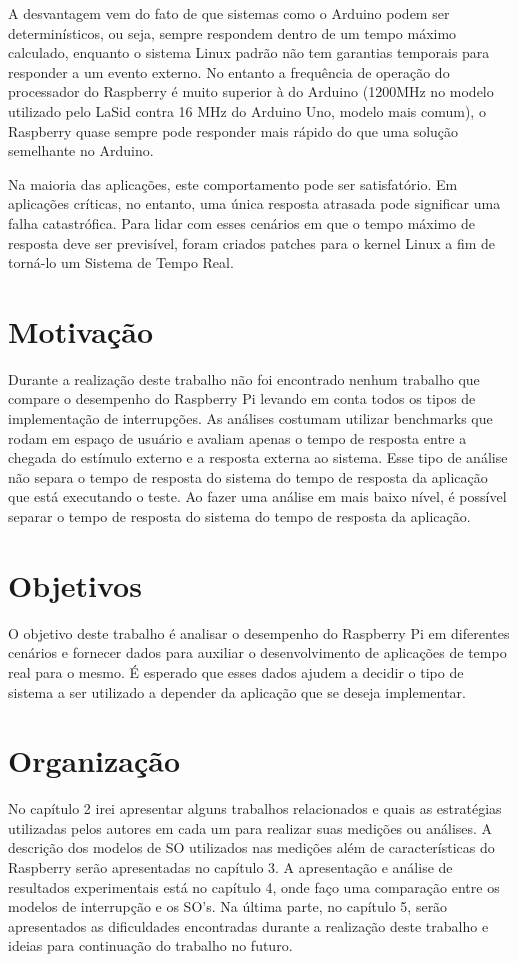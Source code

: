 A desvantagem vem do fato de que sistemas como o Arduino podem ser determinísticos, ou seja, sempre respondem dentro de um tempo máximo calculado, enquanto o sistema Linux padrão não tem garantias temporais para responder a um evento externo. No entanto a frequência de operação do processador do Raspberry é muito superior à do Arduino (1200MHz no modelo utilizado pelo LaSid contra 16 MHz do Arduino Uno, modelo mais comum), o Raspberry quase sempre pode responder mais rápido do que uma solução semelhante no Arduino.

Na maioria das aplicações, este comportamento pode ser satisfatório. Em aplicações críticas, no entanto, uma única resposta atrasada pode significar uma falha catastrófica. Para lidar com esses cenários em que o tempo máximo de resposta deve ser previsível, foram criados patches para o kernel Linux a fim de torná-lo um Sistema de Tempo Real. 

\section{Motivação}

Durante a realização deste trabalho não foi encontrado nenhum trabalho que compare o desempenho do Raspberry Pi levando em conta todos os tipos de implementação de interrupções. As análises costumam utilizar benchmarks que rodam em espaço de usuário e avaliam apenas o tempo de resposta entre a chegada do estímulo externo e a resposta externa ao sistema. Esse tipo de análise não separa o tempo de resposta do sistema do tempo de resposta da aplicação que está executando o teste. Ao fazer uma análise em mais baixo nível, é possível separar o tempo de resposta do sistema do tempo de resposta da aplicação.

\section{Objetivos}

O objetivo deste trabalho é analisar o desempenho do Raspberry Pi em diferentes cenários e fornecer dados para auxiliar o desenvolvimento de aplicações de tempo real para o mesmo. É esperado que esses dados ajudem a decidir o tipo de sistema a ser utilizado a depender da aplicação que se deseja implementar.

\section{Organização}

No capítulo 2 irei apresentar alguns trabalhos relacionados e quais as estratégias utilizadas pelos autores em cada um para realizar suas medições ou análises. A descrição dos modelos de SO utilizados nas medições além de características do Raspberry serão apresentadas no capítulo 3. A apresentação e análise de resultados experimentais está no capítulo 4, onde faço uma comparação entre os modelos de interrupção e os SO's. Na última parte, no capítulo 5, serão apresentados as dificuldades encontradas durante a realização deste trabalho e ideias para continuação do trabalho no futuro.